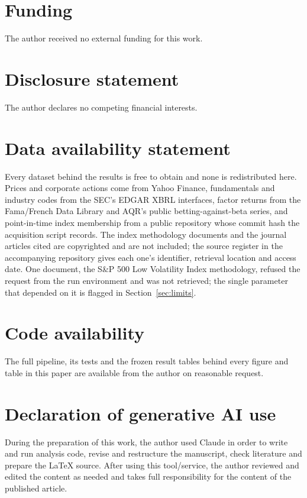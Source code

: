\section*{Funding}
The author received no external funding for this work.

\section*{Disclosure statement}
The author declares no competing financial interests.

\section*{Data availability statement}
Every dataset behind the results is free to obtain and none is redistributed
here. Prices and corporate actions come from Yahoo Finance, fundamentals and
industry codes from the SEC's EDGAR XBRL interfaces, factor returns from the
Fama/French Data Library and AQR's public betting-against-beta series, and
point-in-time index membership from a public repository whose commit hash the
acquisition script records. The index methodology documents and the journal
articles cited are copyrighted and are not included; the source register in
the accompanying repository gives each one's identifier, retrieval location and
access date. One document, the S\&P 500 Low Volatility Index methodology,
refused the request from the run environment and was not retrieved; the single
parameter that depended on it is flagged in Section~\ref{sec:limits}.

\section*{Code availability}
The full pipeline, its tests and the frozen result tables behind every figure
and table in this paper are available from the author on reasonable request.

\section*{Declaration of generative AI use}
During the preparation of this work, the author used Claude in order to write
and run analysis code, revise and restructure the manuscript, check literature
and prepare the \LaTeX{} source. After using this tool/service, the author
reviewed and edited the content as needed and takes full responsibility for the
content of the published article.
